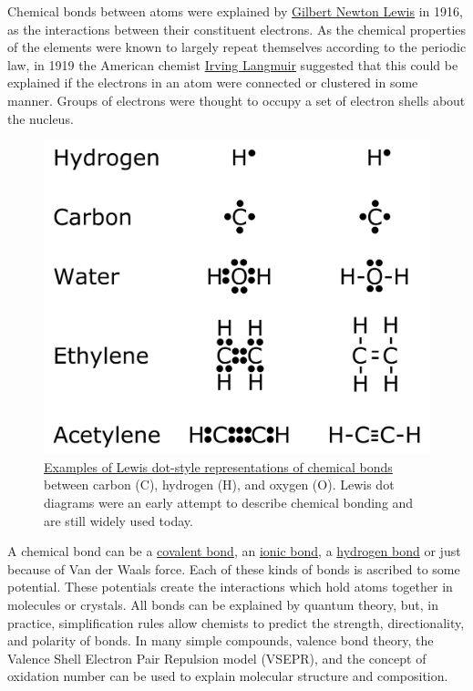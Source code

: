 Chemical bonds between atoms were explained by \href{https://en.wikipedia.org/wiki/Gilbert_N._Lewis}{Gilbert Newton Lewis} in 1916, as the interactions between their constituent electrons. As the chemical properties of the elements were known to largely repeat themselves according to the periodic law, in 1919 the American chemist \href{https://en.wikipedia.org/wiki/Irving_Langmuir}{Irving Langmuir} suggested that this could be explained if the electrons in an atom were connected or clustered in some manner. Groups of electrons were thought to occupy a set of electron shells about the nucleus.

\begin{figure}

{\centering \includegraphics[width=0.7\linewidth]{./figures/chemistry/Electron_dot} 

}

\caption{\href{https://en.wikipedia.org/wiki/Chemical_bond\#/media/File:Electron_dot.svg}{Examples of Lewis dot-style representations of chemical bonds} between carbon (C), hydrogen (H), and oxygen (O). Lewis dot diagrams were an early attempt to describe chemical bonding and are still widely used today.}\label{fig:lewisbond}
\end{figure}

A chemical bond can be a \href{https://en.wikipedia.org/wiki/Covalent_bond}{covalent bond}, an \href{https://en.wikipedia.org/wiki/Ionic_bonding}{ionic bond}, a \href{https://en.wikipedia.org/wiki/Hydrogen_bond}{hydrogen bond} or just because of Van der Waals force. Each of these kinds of bonds is ascribed to some potential. These potentials create the interactions which hold atoms together in molecules or crystals. All bonds can be explained by quantum theory, but, in practice, simplification rules allow chemists to predict the strength, directionality, and polarity of bonds. In many simple compounds, valence bond theory, the Valence Shell Electron Pair Repulsion model (VSEPR), and the concept of oxidation number can be used to explain molecular structure and composition.

